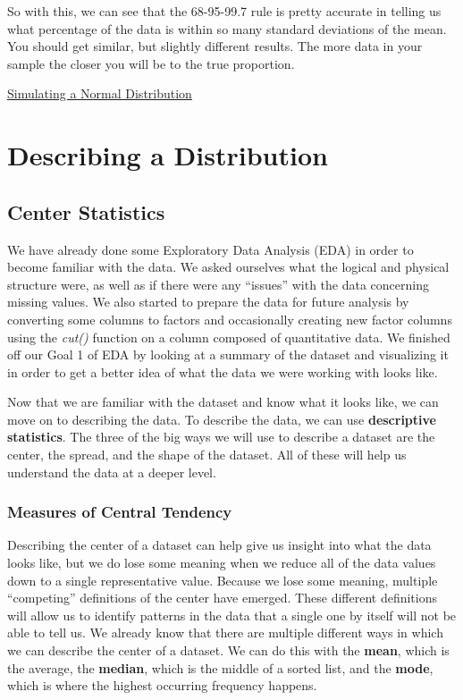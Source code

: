 \documentclass[
  letterpaper,
  DIV=11,
  numbers=noendperiod]{scrreprt}
\begin{document}
So with this, we can see that the 68-95-99.7 rule is pretty accurate in
telling us what percentage of the data is within so many standard
deviations of the mean. You should get similar, but slightly different
results. The more data in your sample the closer you will be to the true
proportion.

\begin{watch}{}{}
    \href{https://youtu.be/0C7qVM9wr3c}{Simulating a Normal Distribution}
\end{watch}


\chapter{Describing a Distribution}\label{describing-a-distribution}

\section{Center Statistics}\label{center-statistics}

We have already done some Exploratory Data Analysis (EDA) in order to
become familiar with the data. We asked ourselves what the logical and
physical structure were, as well as if there were any ``issues'' with
the data concerning missing values. We also started to prepare the data
for future analysis by converting some columns to factors and
occasionally creating new factor columns using the \emph{cut()} function
on a column composed of quantitative data. We finished off our Goal 1 of
EDA by looking at a summary of the dataset and visualizing it in order
to get a better idea of what the data we were working with looks like.

Now that we are familiar with the dataset and know what it looks like,
we can move on to describing the data. To describe the data, we can use
\textbf{descriptive statistics}. The three of the big ways we will use
to describe a dataset are the center, the spread, and the shape of the
dataset. All of these will help us understand the data at a deeper
level.

\subsection{Measures of Central
Tendency}\label{measures-of-central-tendency}

Describing the center of a dataset can help give us insight into what
the data looks like, but we do lose some meaning when we reduce all of
the data values down to a single representative value. Because we lose
some meaning, multiple ``competing'' definitions of the center have
emerged. These different definitions will allow us to identify patterns
in the data that a single one by itself will not be able to tell us. We
already know that there are multiple different ways in which we can
describe the center of a dataset. We can do this with the \textbf{mean},
which is the average, the \textbf{median}, which is the middle of a
sorted list, and the \textbf{mode}, which is where the highest occurring
frequency happens.
\end{document}
